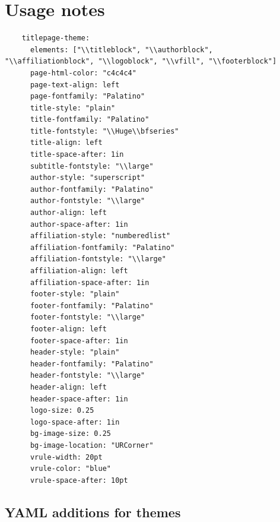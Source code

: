 \documentclass[
  oneside,
  open=any]{scrbook}
\renewcommand*\contentsname{Table of contents}
\newcommand\contentsname{Table of contents}
\begin{document}
\renewcommand*\contentsname{Table of contents}
{
\setcounter{tocdepth}{2}
\tableofcontents
}
\listoffigures
\listoftables
\mainmatter
\hypertarget{usage-notes}{%
\chapter{Usage notes}\label{usage-notes}}

\begin{verbatim}
    titlepage-theme: 
      elements: ["\\titleblock", "\\authorblock", "\\affiliationblock", "\\logoblock", "\\vfill", "\\footerblock"]
      page-html-color: "c4c4c4"
      page-text-align: left
      page-fontfamily: "Palatino"
      title-style: "plain"
      title-fontfamily: "Palatino"
      title-fontstyle: "\\Huge\\bfseries"
      title-align: left
      title-space-after: 1in
      subtitle-fontstyle: "\\large"
      author-style: "superscript"
      author-fontfamily: "Palatino"
      author-fontstyle: "\\large"
      author-align: left
      author-space-after: 1in
      affiliation-style: "numberedlist"
      affiliation-fontfamily: "Palatino"
      affiliation-fontstyle: "\\large"
      affiliation-align: left
      affiliation-space-after: 1in
      footer-style: "plain"
      footer-fontfamily: "Palatino"
      footer-fontstyle: "\\large"
      footer-align: left
      footer-space-after: 1in
      header-style: "plain"
      header-fontfamily: "Palatino"
      header-fontstyle: "\\large"
      header-align: left
      header-space-after: 1in
      logo-size: 0.25
      logo-space-after: 1in
      bg-image-size: 0.25
      bg-image-location: "URCorner"
      vrule-width: 20pt
      vrule-color: "blue"
      vrule-space-after: 10pt
\end{verbatim}

\hypertarget{yaml-additions-for-themes}{%
\section{YAML additions for themes}\label{yaml-additions-for-themes}}
\end{document}
